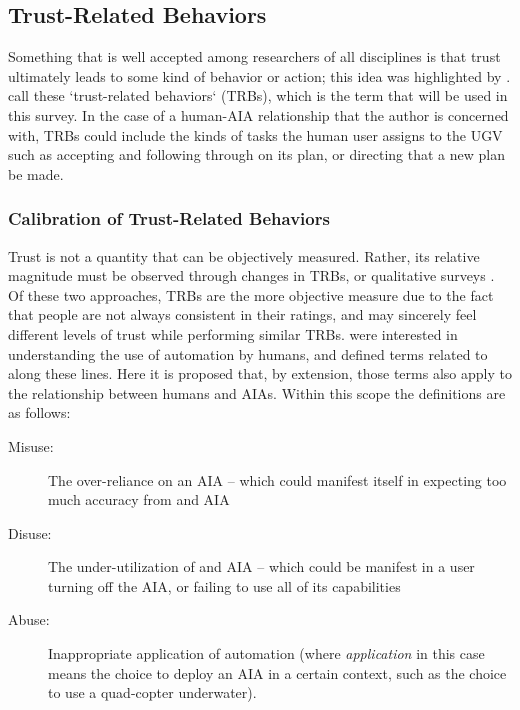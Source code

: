 \subsection{Trust-Related Behaviors} \label{sec:trbs}
Something that is well accepted among researchers of all disciplines is that trust ultimately leads to some kind of behavior or action; this idea was highlighted by \citet{Lewis1985-pr}.  \citet{McKnight2001-fa} call these `trust-related behaviors` (TRBs), which is the term that will be used in this survey. In the case of a human-AIA relationship that the author is concerned with, TRBs could include the kinds of tasks the human user assigns to the UGV such as accepting and following through on its plan, or directing that a new plan be made.

\subsubsection{Calibration of Trust-Related Behaviors}
    Trust is not a quantity that can be objectively measured. Rather, its relative magnitude must be observed through changes in TRBs, or qualitative surveys \cite{Muir1996-gt}. Of these two approaches, TRBs are the more objective measure due to the fact that people are not always consistent in their ratings, and may sincerely feel different levels of trust while performing similar TRBs. \citet{Parasuraman1997-co} were interested in understanding the use of automation by humans, and defined terms related to  along these lines. Here it is proposed that, by extension, those terms also apply to the relationship between humans and AIAs. Within this scope the definitions are as follows:%
    
    \begin{description}
        \item [Misuse:] The over-reliance on an AIA -- which could manifest itself in expecting too much accuracy from and AIA
        \item [Disuse:] The under-utilization of and AIA -- which could be manifest in a user turning off the AIA, or failing to use all of its capabilities 
        \item [Abuse:] Inappropriate application of automation (where \emph{application} in this case means the choice to deploy an AIA in a certain context, such as the choice to use a quad-copter underwater).
    \end{description}

